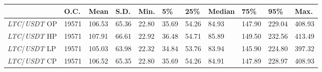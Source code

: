 \begin{tabular}{lllllllllll}
\toprule
 & \textbf{O.C.} & \textbf{Mean} & \textbf{S.D.} & \textbf{Min.} & \textbf{5\%} & \textbf{25\%} & \textbf{Median} & \textbf{75\%} & \textbf{95\%} & \textbf{Max.} \\
\midrule
\emph{LTC}/\emph{USDT} OP & 19571 & 106.53 & 65.36 & 22.80 & 35.69 & 54.26 & 84.93 & 147.90 & 229.04 & 408.93 \\
\emph{LTC}/\emph{USDT} HP & 19571 & 107.91 & 66.61 & 22.92 & 36.48 & 54.71 & 85.89 & 149.50 & 232.56 & 413.49 \\
\emph{LTC}/\emph{USDT} LP & 19571 & 105.03 & 63.98 & 22.32 & 34.84 & 53.76 & 83.94 & 145.90 & 224.80 & 397.32 \\
\emph{LTC}/\emph{USDT} CP & 19571 & 106.52 & 65.35 & 22.80 & 35.69 & 54.26 & 84.91 & 147.89 & 228.97 & 408.93 \\
\bottomrule
\end{tabular}
